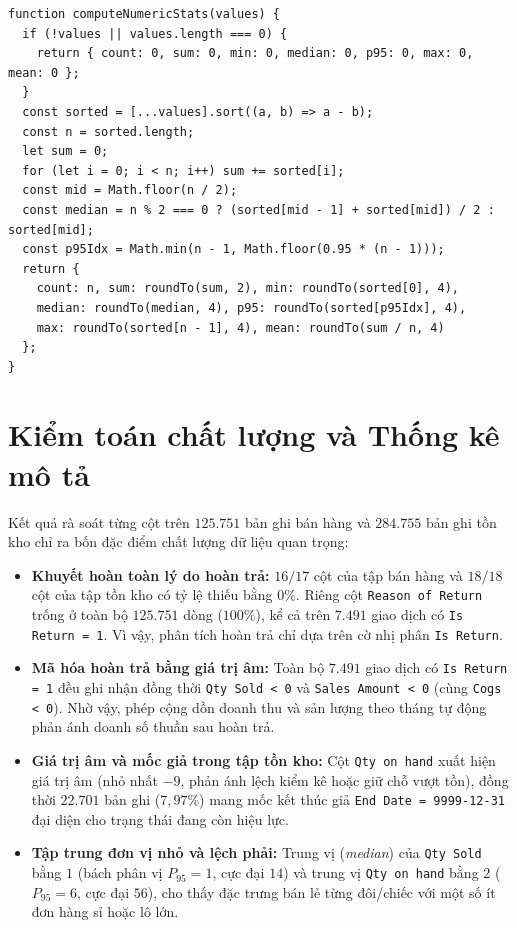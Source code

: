\begin{listing}[H]
	\begin{verbatim}
function computeNumericStats(values) {
  if (!values || values.length === 0) {
    return { count: 0, sum: 0, min: 0, median: 0, p95: 0, max: 0, mean: 0 };
  }
  const sorted = [...values].sort((a, b) => a - b);
  const n = sorted.length;
  let sum = 0;
  for (let i = 0; i < n; i++) sum += sorted[i];
  const mid = Math.floor(n / 2);
  const median = n % 2 === 0 ? (sorted[mid - 1] + sorted[mid]) / 2 : sorted[mid];
  const p95Idx = Math.min(n - 1, Math.floor(0.95 * (n - 1)));
  return {
    count: n, sum: roundTo(sum, 2), min: roundTo(sorted[0], 4),
    median: roundTo(median, 4), p95: roundTo(sorted[p95Idx], 4),
    max: roundTo(sorted[n - 1], 4), mean: roundTo(sum / n, 4)
  };
}
\end{verbatim}
	\caption{Hàm tính thống kê mô tả và phân vị trong \texttt{scripts/eda\_report.js}}
	\label{lst:eda-stats}
\end{listing}

\section{Kiểm toán chất lượng và Thống kê mô tả}
\label{sec:ch2-audit}
Kết quả rà soát từng cột trên $125.751$ bản ghi bán hàng và $284.755$ bản ghi tồn kho chỉ ra bốn đặc điểm chất lượng dữ liệu quan trọng:
\begin{itemize}[topsep=0pt, itemsep=1pt]
	\item \textbf{Khuyết hoàn toàn lý do hoàn trả:} $16/17$ cột của tập bán hàng và $18/18$ cột của tập tồn kho có tỷ lệ thiếu bằng $0\%$. Riêng cột \texttt{Reason of Return} trống ở toàn bộ $125.751$ dòng ($100\%$), kể cả trên $7.491$ giao dịch có \texttt{Is Return = 1}. Vì vậy, phân tích hoàn trả chỉ dựa trên cờ nhị phân \texttt{Is Return}.
	\item \textbf{Mã hóa hoàn trả bằng giá trị âm:} Toàn bộ $7.491$ giao dịch có \texttt{Is Return = 1} đều ghi nhận đồng thời \texttt{Qty Sold < 0} và \texttt{Sales Amount < 0} (cùng \texttt{Cogs < 0}). Nhờ vậy, phép cộng dồn doanh thu và sản lượng theo tháng tự động phản ánh doanh số thuần sau hoàn trả.
	\item \textbf{Giá trị âm và mốc giả trong tập tồn kho:} Cột \texttt{Qty on hand} xuất hiện giá trị âm (nhỏ nhất $-9$, phản ánh lệch kiểm kê hoặc giữ chỗ vượt tồn), đồng thời $22.701$ bản ghi ($7{,}97\%$) mang mốc kết thúc giả \texttt{End Date = 9999-12-31} đại diện cho trạng thái đang còn hiệu lực.
	\item \textbf{Tập trung đơn vị nhỏ và lệch phải:} Trung vị (\textit{median}) của \texttt{Qty Sold} bằng $1$ (bách phân vị $P_{95} = 1$, cực đại $14$) và trung vị \texttt{Qty on hand} bằng $2$ ($P_{95} = 6$, cực đại $56$), cho thấy đặc trưng bán lẻ từng đôi/chiếc với một số ít đơn hàng sỉ hoặc lô lớn.
\end{itemize}

